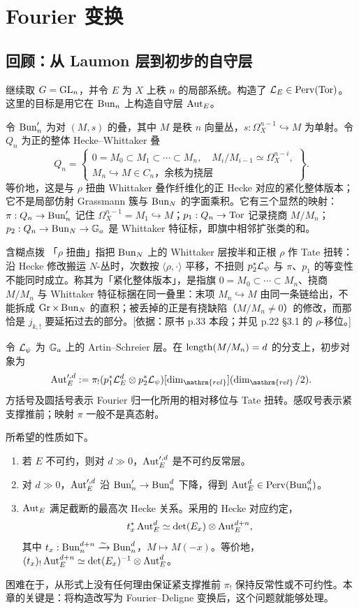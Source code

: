 \chapter{Fourier 变换}\label{ch:5}
\section{回顾：从 Laumon 层到初步的自守层}\label{sec:5.1}
继续取 $G=\operatorname{GL}_n$，并令 $E$ 为 $X$ 上秩 $n$ 的局部系统。构造了 $\mathcal{L}_E\in\operatorname{Perv}(\operatorname{Tor})$。这里的目标是用它在 $\operatorname{Bun}_n$ 上构造自守层 $\operatorname{Aut}_E$。

令 $\operatorname{Bun}'_n$ 为对 $(M,s)$ 的叠，其中 $M$ 是秩 $n$ 向量丛，$s:\Omega_X^{n-1}\hookrightarrow M$ 为单射。令 $Q_n$ 为正的整体 Hecke–Whittaker 叠
\[Q_n=\left\{\begin{array}{l}0=M_0\subset M_1\subset\cdots\subset M_n,\quad M_i/M_{i-1}\simeq\Omega_X^{n-i},\\M_n\hookrightarrow M\in C_n\text{，余核为挠层}\end{array}\right\}.\]
等价地，这是与 $\rho$ 扭曲 Whittaker 叠作纤维化的正 Hecke 对应的紧化整体版本；它不是局部仿射 Grassmann 簇与 $\operatorname{Bun}_N$ 的字面乘积。它有三个显然的映射：$\pi:Q_n\to\operatorname{Bun}'_n$ 记住 $\Omega_X^{n-1}=M_1\hookrightarrow M$；$p_1:Q_n\to\operatorname{Tor}$ 记录挠商 $M/M_n$；$p_2:Q_n\to\operatorname{Bun}_N\to\mathbb{G}_{a}$ 是 Whittaker 特征标，即旗中相邻扩张类的和。
\begin{transnote}{含糊点拨}
「$\rho$ 扭曲」指把 $\operatorname{Bun}_N$ 上的 Whittaker 层按半和正根 $\rho$ 作 Tate 扭转：沿 Hecke 修改搬运 $N$-丛时，次数按 $\langle\rho,\cdot\rangle$ 平移，不扭则 $p_2^*\mathcal{L}_\psi$ 与 $\pi$、$p_1$ 的等变性不能同时成立。称其为「紧化整体版本」，是指旗 $0=M_0\subset\cdots\subset M_n$、挠商 $M/M_n$ 与 Whittaker 特征标捆在同一叠里：末项 $M_n\hookrightarrow M$ 由同一条链给出，不能拆成 $\operatorname{Gr}\times\operatorname{Bun}_N$ 的直积；被丢掉的正是有挠缺陷（$M/M_n\ne 0$）的修改，而那恰是 $j_{k,!}$ 要延拓过去的部分。[依据：原书 p.33 本段；并见 p.22 §3.1 的 $\rho$-移位。]
\end{transnote}

令 $\mathcal{L}_\psi$ 为 $\mathbb{G}_{a}$ 上的 Artin–Schreier 层。在 $\operatorname{length}(M/M_n)=d$ 的分支上，初步对象为
\[\Aut_E^{\prime,d}:=\pi_!(p_1^*\cL_E^d\otimes p_2^*\cL_\psi)[\dim_{\mathrm{rel}}](\dim_{\mathrm{rel}}/2).\]
方括号及圆括号表示 Fourier 归一化所用的相对移位与 Tate 扭转。感叹号表示紧支撑推前；映射 $\pi$ 一般不是真态射。

所希望的性质如下。
\begin{enumerate}
\item 若 $E$ 不可约，则对 $d\gg0$，$\operatorname{Aut}_E^{\prime,d}$ 是不可约反常层。
\item 对 $d\gg0$，$\operatorname{Aut}_E^{\prime,d}$ 沿 $\operatorname{Bun}'_n\to\operatorname{Bun}_n^d$ 下降，得到 $\operatorname{Aut}_E^d\in\operatorname{Perv}(\operatorname{Bun}_n^d)$。
\item $\operatorname{Aut}_E$ 满足截断的最高次 Hecke 关系。采用的 Hecke 对应约定，
\[t_x^*\operatorname{Aut}_E^d\simeq\det(E_x)\otimes\operatorname{Aut}_E^{d+n},\]
其中 $t_x:\operatorname{Bun}_n^{d+n}\xrightarrow{\sim}\operatorname{Bun}_n^d$，$M\mapsto M(-x)$。等价地，$(t_x)_!\operatorname{Aut}_E^{d+n}\simeq\det(E_x)^{-1}\otimes\operatorname{Aut}_E^d$。
\end{enumerate}
困难在于，从形式上没有任何理由保证紧支撑推前 $\pi_!$ 保持反常性或不可约性。本章的关键是：将构造改写为 Fourier–Deligne 变换\cite{KL85}后，这个问题就能够处理。
